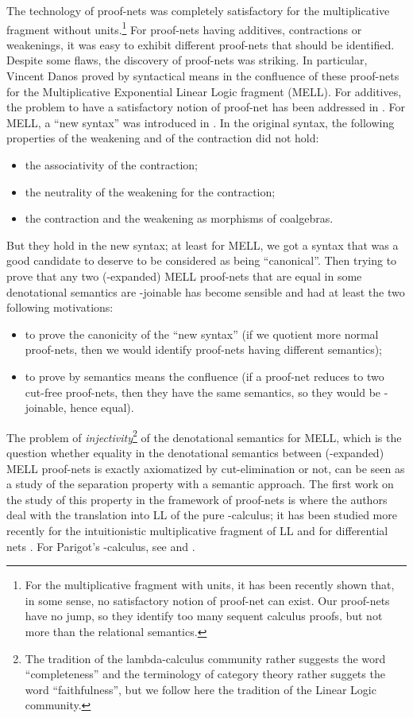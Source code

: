 \documentclass{article}
\theoremstyle{plain}
\begin{document}
The technology of proof-nets was completely satisfactory for the multiplicative fragment without units.\footnote{For the multiplicative fragment with units, it has been recently shown \cite{MLLwithunits} that, in some sense, no satisfactory notion of proof-net can exist. Our proof-nets have no jump, so they identify too many sequent calculus proofs, but not more than the relational semantics.} For proof-nets having additives, contractions or weakenings, it was easy to exhibit different proof-nets that should be identified. Despite some flaws, the discovery of proof-nets was striking. In particular, Vincent Danos proved by syntactical means in \cite{phddanos} the confluence of these proof-nets for the Multiplicative Exponential Linear Logic fragment (MELL). For additives, the problem to have a satisfactory notion of proof-net has been addressed in \cite{mallpn}. For MELL, a ``new syntax'' was introduced in \cite{hilbert}. In the original syntax, the following properties of the weakening and of the contraction did not hold:
\begin{itemize}
\item the associativity of the contraction;
\item the neutrality of the weakening for the contraction;
\item the contraction and the weakening as morphisms of coalgebras.
\end{itemize}
But they hold in the new syntax; at least for MELL, we got a syntax that was a good candidate to deserve to be considered as being ``canonical''. Then trying to prove that any two (-expanded) MELL proof-nets that are equal in some denotational semantics are -joinable has become sensible and had at least the two following motivations:
\begin{itemize}
\item to prove the canonicity of the ``new syntax'' (if we quotient more normal proof-nets, then we would identify proof-nets having different semantics);
\item to prove by semantics means the confluence (if a proof-net reduces to two cut-free proof-nets, then they have the same semantics, so they would be -joinable, hence equal).
\end{itemize}
The problem of \emph{injectivity}\footnote{The tradition of the lambda-calculus community rather suggests the word ``completeness'' and the terminology of category theory rather suggets the word ``faithfulness'', but we follow here the tradition of the Linear Logic community.} of the denotational semantics for MELL, which is the question whether equality in the denotational semantics between (-expanded) MELL proof-nets is exactly axiomatized by cut-elimination or not, can be seen as a study of the separation property with a semantic approach. The first work on the study of this property in the framework of proof-nets is \cite{Marco} where the
authors deal with the translation into LL of the pure -calculus; it has been studied more recently for the intuitionistic multiplicative
fragment of LL \cite{typedbohm} and for differential nets \cite{separationdiff}. For Parigot's -calculus, see \cite{lmbohm} and \cite{separationsaurin}.
\end{document}
